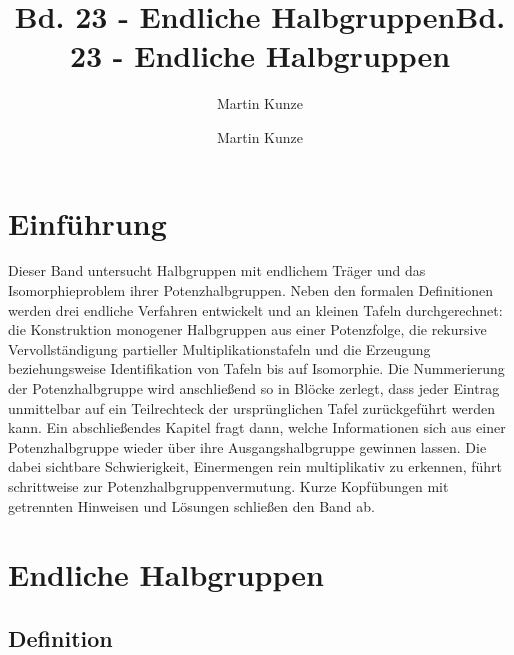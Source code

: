 \documentclass[main.tex]{subfiles}
\title{Bd. 23 - Endliche Halbgruppen}
\author{Martin Kunze}
\date{}
\begin{document}
\title{Bd. 23 - Endliche Halbgruppen}
\author{Martin Kunze}
\date{}
\hypersetup{pageanchor=false}
\maketitle
\hypersetup{pageanchor=true}
\setcounter{tocdepth}{3}
\tableofcontents
\setcounter{file}{23}
\renewcommand{\FormulaBandID}{23}

\chapter{Einführung}

Dieser Band untersucht Halbgruppen mit endlichem Träger und das
Isomorphieproblem ihrer Potenzhalbgruppen.  Neben den formalen Definitionen
werden drei endliche Verfahren entwickelt und an kleinen Tafeln
durchgerechnet: die Konstruktion monogener Halbgruppen aus einer Potenzfolge,
die rekursive Vervollständigung partieller Multiplikationstafeln und die
Erzeugung beziehungsweise Identifikation von Tafeln bis auf Isomorphie.  Die
Nummerierung der Potenzhalbgruppe wird anschließend so in Blöcke zerlegt,
dass jeder Eintrag unmittelbar auf ein Teilrechteck der ursprünglichen Tafel
zurückgeführt werden kann.  Ein abschließendes Kapitel fragt dann, welche
Informationen sich aus einer Potenzhalbgruppe wieder über ihre
Ausgangshalbgruppe gewinnen lassen.  Die dabei sichtbare Schwierigkeit,
Einermengen rein multiplikativ zu erkennen, führt schrittweise zur
Potenzhalbgruppenvermutung.  Kurze Kopfübungen mit getrennten Hinweisen und
Lösungen schließen den Band ab.

\chapter{Endliche Halbgruppen}

\section{Definition}


\end{document}
